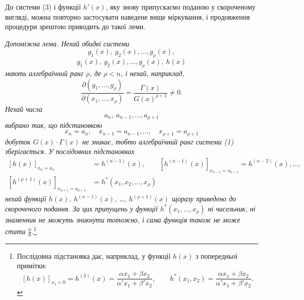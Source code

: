 \documentclass[11pt]{article}
\begin{document}
До системи (3) і функції $h'(x)$, яку знову припускаємо поданою у скороченому вигляді, можна повторно застосувати наведене вище міркування, і продовження процедури зрештою приводить до такої леми.

\emph{Допоміжна лема. Нехай обидві системи}
\[
  g_1(x),\ g_2(x),\ldots,g_\rho(x),
\]
\[
  g_1(x),\ g_2(x),\ldots,g_\rho(x),\ h(x)
\]
\emph{мають алгебраїчний ранг $\rho$, де $\rho<n$, і нехай, наприклад,}
\[
 \frac{\partial(g_1,\ldots,g_\rho)}{\partial(x_1,
\ldots,x_\rho)}
 =\frac{\Gamma(x)}{G(x)^{\rho+1}}\ne0.
\]
\emph{Нехай числа}
\[
  a_n,\ a_{n-1},\ldots,a_{\rho+1}
\]
\emph{вибрано так, що підстановкою}
\[
  x_n=a_n,\quad x_{n-1}=a_{n-1},\ldots,\quad x_{\rho+1}=a_{\rho+1}
\]
\emph{добуток $G(x)\cdot\Gamma(x)$ не зникає, тобто алгебраїчний ранг системи (1) зберігається. У послідовних підстановках}
\[
\begin{aligned}
 [h(x)]_{x_n=a_n}&=h^{(n-1)}(x),\qquad
 [h^{(n-1)}(x)]_{x_{n-1}=a_{n-1}}=h^{(n-2)}(x),\ldots,\\
 [h^{(\rho+1)}(x)]_{x_{\rho+1}=a_{\rho+1}}&=h^*(x_1,x_2,\ldots,x_\rho)
\end{aligned}
\]
\emph{нехай функції $h(x)$, $h^{(n-1)}(x)$, \ldots, $h^{(\rho+1)}(x)$ щоразу приведено до скороченого подання. За цих припущень у функції $h^*(x_1,\ldots,x_\rho)$ ні чисельник, ні знаменник не можуть зникнути тотожно, і сама функція також не може стати $\frac{0}{0}$.}\footnote{Послідовна підстановка дає, наприклад, у функції $h(x)$ з попередньої примітки:
\[
 [h(x)]_{x_4=0}=h^{(3)}(x)=\frac{\alpha x_1+\beta x_2}{\alpha' x_1+\beta' x_2},\qquad
 h^*(x_1,x_2)=\frac{\alpha x_1+\beta x_2}{\alpha' x_1+\beta' x_2}.
\]}
\end{document}
